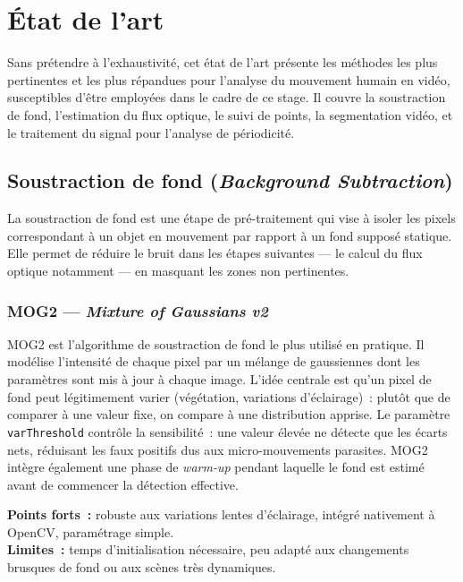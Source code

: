 \section{État de l'art}

Sans prétendre à l'exhaustivité, cet état de l'art présente les méthodes les plus 
pertinentes et les plus répandues pour l'analyse du mouvement humain en vidéo, 
susceptibles d'être employées dans le cadre de ce stage. Il couvre la soustraction 
de fond, l'estimation du flux optique, le suivi de points, la segmentation vidéo, 
et le traitement du signal pour l'analyse de périodicité.

\subsection{Soustraction de fond (\textit{Background Subtraction})}

La soustraction de fond est une étape de pré-traitement qui vise à isoler les pixels correspondant à un objet en mouvement par rapport à un fond supposé statique. Elle permet de réduire le bruit dans les étapes suivantes --- le calcul du flux optique notamment --- en masquant les zones non pertinentes.

\subsubsection{MOG2 --- \textit{Mixture of Gaussians v2}}

MOG2 est l'algorithme de soustraction de fond le plus utilisé en pratique. Il modélise l'intensité de chaque pixel par un mélange de gaussiennes dont les paramètres sont mis à jour à chaque image. L'idée centrale est qu'un pixel de fond peut légitimement varier (végétation, variations d'éclairage)~: plutôt que de comparer à une valeur fixe, on compare à une distribution apprise. Le paramètre \texttt{varThreshold} contrôle la sensibilité~: une valeur élevée ne détecte que les écarts nets, réduisant les faux positifs dus aux micro-mouvements parasites. MOG2 intègre également une phase de \textit{warm-up} pendant laquelle le fond est estimé avant de commencer la détection effective.

\medskip
\noindent\textbf{Points forts~:} robuste aux variations lentes d'éclairage, intégré nativement à OpenCV, paramétrage simple.\\
\textbf{Limites~:} temps d'initialisation nécessaire, peu adapté aux changements brusques de fond ou aux scènes très dynamiques.

